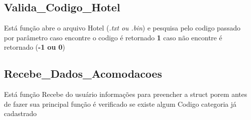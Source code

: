 \documentclass{article}
\begin{document}
\subsection{Valida\_Codigo\_Hotel}
	Está função  abre o arquivo Hotel (\textit{.txt ou .bin}) e pesquisa pelo codigo passado por parâmetro caso encontre o codigo é retornado \textbf{1} caso  não encontre é retornado (\textbf{-1 ou 0})

\subsection{Recebe\_Dados\_Acomodacoes}	
	Está função Recebe do usuário informações para preencher a struct porem antes de fazer sua principal função é verificado se existe algum Codigo categoria já cadastrado
	
\end{document}

